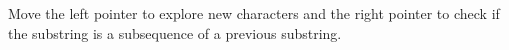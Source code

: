 \documentclass[preview]{standalone}
\begin{document}
Move the left pointer to explore new characters and the right pointer to check if the substring is a subsequence of a previous substring.\\
\end{document}
